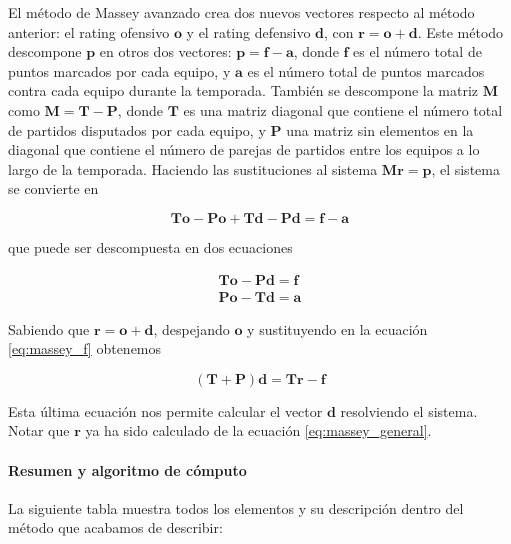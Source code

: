 El método de Massey avanzado crea dos nuevos vectores respecto al método anterior: el rating ofensivo $\mathbf{o}$ y el rating defensivo $\mathbf{d}$, con $\mathbf{r} = \mathbf{o} + \mathbf{d}$. Este método descompone $\mathbf{p}$ en otros dos vectores: $ \mathbf{p} = \mathbf{f} - \mathbf{a}$, donde $\mathbf{f}$ es el número total de puntos marcados por cada equipo, y $\mathbf{a}$ es el número total de puntos marcados contra cada equipo durante la temporada. También se descompone la matriz $\mathbf{M}$ como $\mathbf{M} = \mathbf{T} - \mathbf{P}$, donde $\mathbf{T}$ es una matriz diagonal que contiene el número total de partidos disputados por cada equipo, y $\mathbf{P}$ una matriz sin elementos en la diagonal que contiene el número de parejas de partidos entre los equipos a lo largo de la temporada. Haciendo las sustituciones al sistema $\mathbf{M r } = \mathbf{p}$, el sistema se convierte en

\begin{equation}
\mathbf{T o} - \mathbf{P o} + \mathbf{T d} - \mathbf{P d} = \mathbf{f} - \mathbf{a}
\end{equation}

que puede ser descompuesta en dos ecuaciones

\begin{eqnarray}
\mathbf{T o} - \mathbf{P d} = \mathbf{f}\\ \label{eq:massey_f}
\mathbf{P o} - \mathbf{T d} = \mathbf{a} \label{eq:massey}
\end{eqnarray} 

Sabiendo que $\mathbf{r} = \mathbf{o} + \mathbf{d}$, despejando $\mathbf{o}$ y sustituyendo en la ecuación \ref{eq:massey_f} obtenemos

\begin{equation}
(\mathbf{T} + \mathbf{P})\mathbf{d} = \mathbf{T r} - \mathbf{f} \label{eq:massey_d}
\end{equation}

Esta última ecuación nos permite calcular el vector $\mathbf{d}$ resolviendo el sistema. Notar que $\mathbf{r}$ ya ha sido calculado de la ecuación \ref{eq:massey_general}.


\paragraph*{Resumen y algoritmo de cómputo}

La siguiente tabla muestra todos los elementos y su descripción dentro del método que acabamos de describir:

